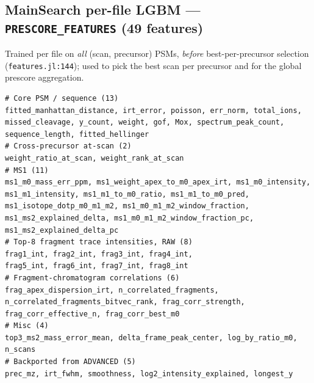 \documentclass[11pt]{article}
\newcommand{\code}[1]{\texttt{#1}}
\begin{document}
\subsection{MainSearch per-file LGBM --- \code{PRESCORE\_FEATURES} (49 features)}
Trained per file on \emph{all} (scan, precursor) PSMs, \emph{before} best-per-precursor
selection (\code{features.jl:144}); used to pick the best scan per precursor and for the
global prescore aggregation.
\begin{lstlisting}
# Core PSM / sequence (13)
fitted_manhattan_distance, irt_error, poisson, err_norm, total_ions,
missed_cleavage, y_count, weight, gof, Mox, spectrum_peak_count,
sequence_length, fitted_hellinger
# Cross-precursor at-scan (2)
weight_ratio_at_scan, weight_rank_at_scan
# MS1 (11)
ms1_m0_mass_err_ppm, ms1_weight_apex_to_m0_apex_irt, ms1_m0_intensity,
ms1_m1_intensity, ms1_m1_to_m0_ratio, ms1_m1_to_m0_pred,
ms1_isotope_dotp_m0_m1_m2, ms1_m0_m1_m2_window_fraction,
ms1_ms2_explained_delta, ms1_m0_m1_m2_window_fraction_pc,
ms1_ms2_explained_delta_pc
# Top-8 fragment trace intensities, RAW (8)
frag1_int, frag2_int, frag3_int, frag4_int,
frag5_int, frag6_int, frag7_int, frag8_int
# Fragment-chromatogram correlations (6)
frag_apex_dispersion_irt, n_correlated_fragments,
n_correlated_fragments_bitvec_rank, frag_corr_strength,
frag_corr_effective_n, frag_corr_best_m0
# Misc (4)
top3_ms2_mass_error_mean, delta_frame_peak_center, log_by_ratio_m0, n_scans
# Backported from ADVANCED (5)
prec_mz, irt_fwhm, smoothness, log2_intensity_explained, longest_y
\end{lstlisting}
\end{document}
